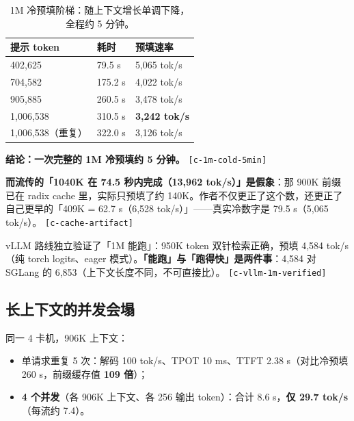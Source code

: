 \begin{table}[t]
\centering
\footnotesize
\setlength{\tabcolsep}{4pt}
\caption{1M 冷预填阶梯：随上下文增长单调下降，全程约 5 分钟。}
\label{tab:11}
\begin{tabular}{lll}
\toprule
提示 token & 耗时 & 预填速率 \\
\midrule
402,625 & 79.5 s & 5,065 tok/s \\
704,582 & 175.2 s & 4,022 tok/s \\
905,885 & 260.5 s & 3,478 tok/s \\
1,006,538 & 310.5 s & \textbf{3,242 tok/s} \\
1,006,538（重复） & 322.0 s & 3,126 tok/s \\
\bottomrule
\end{tabular}
\end{table}

\textbf{结论：一次完整的 1M 冷预填约 5 分钟。} {\scriptsize\texttt{[c-\hspace{0pt}1m-\hspace{0pt}cold-\hspace{0pt}5min]}}


\textbf{而流传的「1040K 在 74.5 秒内完成（13,962 tok/s）」是假象}：那 900K 前缀已在 radix cache 里，实际只预填了约 140K。作者不仅更正了这个数，还更正了自己更早的「409K = 62.7 s（6,528 tok/s）」——真实冷数字是 79.5 s（5,065 tok/s）。 {\scriptsize\texttt{[c-\hspace{0pt}cache-\hspace{0pt}artifact]}}


vLLM 路线独立验证了「1M 能跑」：950K token 双针检索正确，预填 4,584 tok/s（纯 torch logits、eager 模式）。\textbf{「能跑」与「跑得快」是两件事}：4,584 对 SGLang 的 6,853（上下文长度不同，不可直接比）。 {\scriptsize\texttt{[c-\hspace{0pt}vllm-\hspace{0pt}1m-\hspace{0pt}verified]}}


\subsection{长上下文的并发会塌}

同一 4 卡机，906K 上下文：


\begin{itemize}
  \item 单请求重复 5 次：解码 100 tok/s、TPOT 10 ms、TTFT 2.38 s（对比冷预填 260 s，前缀缓存值 \textbf{109 倍}）；
  \item \textbf{4 个并发}（各 906K 上下文、各 256 输出 token）：合计 8.6 s，\textbf{仅 29.7 tok/s}（每流约 7.4）。
\end{itemize}

